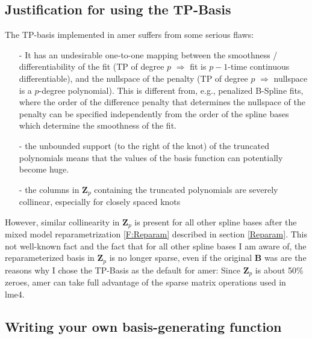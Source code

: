\documentclass[12pt]{article}
\newcommand{\package}[1]{\textsf{\small{#1}}}
\begin{document}
\subsection{Justification for using the TP-Basis}
The TP-basis implemented in \package{amer} suffers from some serious flaws: 
\begin{itemize}
\item[-] It has an undesirable one-to-one mapping between the smoothness /
differentiability of the fit (TP of degree $p$ $\Rightarrow$ fit is $p-1$-time
continuous differentiable), and the nullspace of the penalty (TP of degree $p$
$\Rightarrow$ nullspace is a $p$-degree polynomial). This is different from,
e.g., penalized B-Spline fits, where the order of the difference penalty that
determines the nullspace of the penalty can be specified independently from the
order of the spline bases which determine the smoothness of the fit.
\item[-] the unbounded support (to the right of the knot) of the truncated
polynomials means that the values of the basis function can potentially become
huge.
\item[-] the columns in $\bm Z_p$ containing the truncated polynomials are
severely collinear, especially for closely spaced knots
\end{itemize}
However, similar collinearity in $\bm Z_p$ is present for all other spline bases
after the mixed model reparametrization \eqref{F:Reparam} described in section
\ref{Reparam}. This not well-known fact and the fact that for all other spline
bases I am aware of, the reparameterized basis in $\bm Z_p$ is no longer sparse,
even if the original $\bm B$ was are the reasons why I chose the TP-Basis as the
default for \package{amer}: Since $\bm Z_p$ is about 50\% zeroes, 
\package{amer} can take full advantage of the sparse matrix operations used in
\package{lme4}.


\subsection{Writing your own basis-generating function}\label{RollYourOwn}
\end{document}
